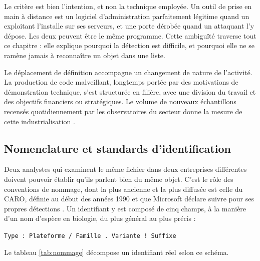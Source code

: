 Le critère est bien l'intention, et non la technique employée. Un outil de prise en main à distance est un logiciel d'administration parfaitement légitime quand un exploitant l'installe sur ses serveurs, et une porte dérobée quand un attaquant l'y dépose. Les deux peuvent être le même programme. Cette ambiguïté traverse tout ce chapitre : elle explique pourquoi la détection est difficile, et pourquoi elle ne se ramène jamais à reconnaître un objet dans une liste.

Le déplacement de définition accompagne un changement de nature de l'activité. La production de code malveillant, longtemps portée par des motivations de démonstration technique, s'est structurée en filière, avec une division du travail et des objectifs financiers ou stratégiques. Le volume de nouveaux échantillons recensés quotidiennement par les observatoires du secteur donne la mesure de cette industrialisation \cite{avtest}.

\subsection{Nomenclature et standards d'identification}

Deux analystes qui examinent le même fichier dans deux entreprises différentes doivent pouvoir établir qu'ils parlent bien du même objet. C'est le rôle des conventions de nommage, dont la plus ancienne et la plus diffusée est celle du CARO, définie au début des années 1990 et que Microsoft déclare suivre pour ses propres détections \cite{msnaming}. Un identifiant y est composé de cinq champs, à la manière d'un nom d'espèce en biologie, du plus général au plus précis :

\begin{center}
\texttt{Type : Plateforme / Famille . Variante ! Suffixe}
\end{center}

Le tableau \ref{tab:nommage} décompose un identifiant réel selon ce schéma.

